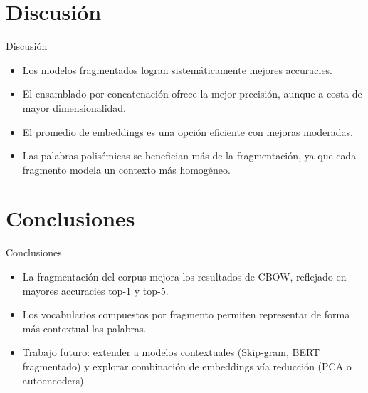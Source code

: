 \documentclass[11pt]{beamer}
\begin{document}
	\section{Discusión}
	\begin{frame}{Discusión}
		\begin{itemize}
			\item Los modelos fragmentados logran sistemáticamente mejores accuracies.
			\item El ensamblado por concatenación ofrece la mejor precisión, aunque a costa de mayor dimensionalidad.
			\item El promedio de embeddings es una opción eficiente con mejoras moderadas.
			\item Las palabras polisémicas se benefician más de la fragmentación, ya que cada fragmento modela un contexto más homogéneo.
		\end{itemize}
	\end{frame}
	
	\section{Conclusiones}
	\begin{frame}{Conclusiones}
		\begin{itemize}
			\item La fragmentación del corpus mejora los resultados de CBOW, reflejado en mayores accuracies top-1 y top-5.
			\item Los vocabularios compuestos por fragmento permiten representar de forma más contextual las palabras.
			\item Trabajo futuro: extender a modelos contextuales (Skip-gram, BERT fragmentado) y explorar combinación de embeddings vía reducción (PCA o autoencoders).
		\end{itemize}
	\end{frame}
	
\end{document}
